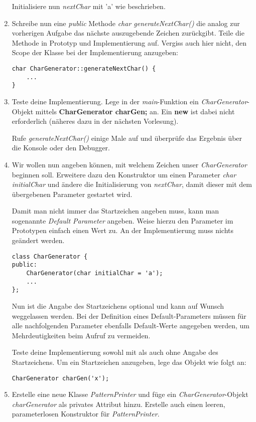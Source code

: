 \begin{enumerate}
Initialisiere nun \emph{nextChar} mit 'a' wie beschrieben.

\item
Schreibe nun eine \emph{public} Methode \emph{char generateNextChar()} die analog zur vorherigen Aufgabe das nächste auszugebende Zeichen zurückgibt.
Teile die Methode in Prototyp und Implementierung auf.
Vergiss auch hier nicht, den Scope der Klasse bei der Implementierung anzugeben:

\begin{lstlisting}
char CharGenerator::generateNextChar() {
	...
}
\end{lstlisting}

\item
Teste deine Implementierung.
Lege in der \emph{main}-Funktion ein \emph{CharGenerator}-Objekt mittels \textbf{CharGenerator charGen;} an.
Ein \textbf{new} ist dabei nicht erforderlich (näheres dazu in der nächsten Vorlesung).

Rufe \emph{generateNextChar()} einige Male auf und überprüfe das Ergebnis über die Konsole oder den Debugger.

\item
Wir wollen nun angeben können, mit welchem Zeichen unser \emph{CharGenerator} beginnen soll.
Erweitere dazu den Konstruktor um einen Parameter \emph{char initialChar} und ändere die Initialisierung von \emph{nextChar}, damit dieser mit dem übergebenen Parameter gestartet wird.

Damit man nicht immer das Startzeichen angeben muss, kann man sogenannte \emph{Default Parameter} angeben.
Weise hierzu den Parameter im Prototypen einfach einen Wert zu.
An der Implementierung muss nichts geändert werden.
\begin{lstlisting}
class CharGenerator {
public:
	CharGenerator(char initialChar = 'a');
	...
};
\end{lstlisting}

Nun ist die Angabe des Startzeichens optional und kann auf Wunsch weggelassen werden.
Bei der Definition eines Default-Parameters müssen für alle nachfolgenden Parameter ebenfalls Default-Werte angegeben werden, um Mehrdeutigkeiten beim Aufruf zu vermeiden. 

Teste deine Implementierung sowohl mit als auch ohne Angabe des Startzeichens.
Um ein Startzeichen anzugeben, lege das Objekt wie folgt an:
\begin{lstlisting}
CharGenerator charGen('x');
\end{lstlisting}


\item
Erstelle eine neue Klasse \emph{PatternPrinter} und füge ein \emph{CharGenerator}-Objekt \emph{charGenerator} als privates Attribut hinzu.
Erstelle auch einen leeren, parameterlosen Konstruktor für \emph{PatternPrinter}.


\end{enumerate}
